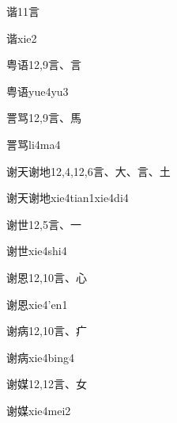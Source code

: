 \begin{entry}{谐}{11}{⾔}
  \begin{phonetics}{谐}{xie2}
  \end{phonetics}
\end{entry}

\begin{entry}{粤语}{12,9}{⾔、⾔}
  \begin{phonetics}{粤语}{yue4yu3}
  \end{phonetics}
\end{entry}

\begin{entry}{詈骂}{12,9}{⾔、⾺}
  \begin{phonetics}{詈骂}{li4ma4}
  \end{phonetics}
\end{entry}

\begin{entry}{谢天谢地}{12,4,12,6}{⾔、⼤、⾔、⼟}
  \begin{phonetics}{谢天谢地}{xie4tian1xie4di4}
  \end{phonetics}
\end{entry}

\begin{entry}{谢世}{12,5}{⾔、⼀}
  \begin{phonetics}{谢世}{xie4shi4}
  \end{phonetics}
\end{entry}

\begin{entry}{谢恩}{12,10}{⾔、⼼}
  \begin{phonetics}{谢恩}{xie4'en1}
  \end{phonetics}
\end{entry}

\begin{entry}{谢病}{12,10}{⾔、⽧}
  \begin{phonetics}{谢病}{xie4bing4}
  \end{phonetics}
\end{entry}

\begin{entry}{谢媒}{12,12}{⾔、⼥}
  \begin{phonetics}{谢媒}{xie4mei2}
  \end{phonetics}
\end{entry}

